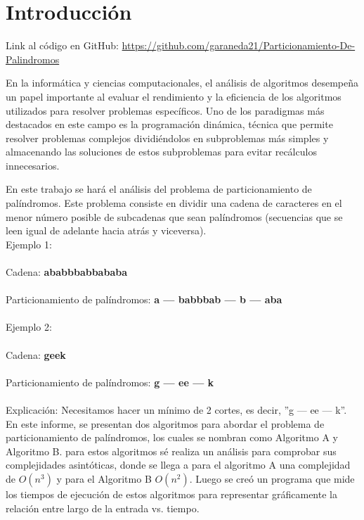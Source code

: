 \documentclass[12pt]{article}
\begin{document}
\section{Introducción}

\vspace{1em}
\begin{minipage}{1\linewidth}
    \centering
    Link al código en GitHub: 
    \url{https://github.com/garaneda21/Particionamiento-De-Palindromos}
\end{minipage}

En la informática y ciencias computacionales, el análisis de algoritmos desempeña un papel importante
al evaluar el rendimiento y la eficiencia de los algoritmos utilizados para resolver problemas
específicos. Uno de los paradigmas más destacados en este campo es la programación dinámica, técnica que permite resolver problemas complejos dividiéndolos en subproblemas más simples y
almacenando las soluciones de estos subproblemas para evitar recálculos innecesarios.

En este trabajo se hará el análisis del problema de particionamiento de palíndromos. Este problema
consiste en dividir una cadena de caracteres en el menor número posible de subcadenas que sean
palíndromos (secuencias que se leen igual de adelante hacia atrás y viceversa). \\

Ejemplo 1: \\\\
Cadena: \textbf{ababbbabbababa} \\\\
Particionamiento de palíndromos: \textbf{a — babbbab — b — aba} \\\\
Ejemplo 2: \\\\
Cadena: \textbf{geek} \\\\
Particionamiento de palíndromos: \textbf{g — ee — k} \\\\
Explicación: Necesitamos hacer un mínimo de 2 cortes, es decir, ”g — ee — k”. \\

En este informe, se presentan dos algoritmos para abordar el problema de particionamiento de 
palíndromos, los cuales se nombran como Algoritmo A y Algoritmo B. para estos algoritmos sé realiza un análisis para comprobar sus complejidades asintóticas, donde se llega a para el algoritmo A una complejidad de $O(n^3)$ y para el Algoritmo B $O(n^2)$. Luego se creó un programa que mide los tiempos de ejecución de estos algoritmos para representar gráficamente la relación entre largo de la entrada vs. tiempo.
\end{document}
